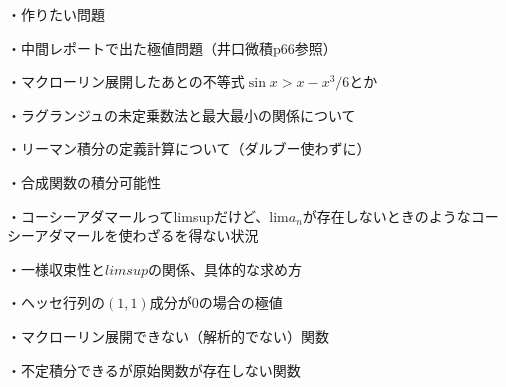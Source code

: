 \documentclass[dvipdfmx]{jsarticle}
\begin{document}
・作りたい問題

・中間レポートで出た極値問題（井口微積p66参照）

・マクローリン展開したあとの不等式$\sin x > x-x^3/6$とか

・ラグランジュの未定乗数法と最大最小の関係について

・リーマン積分の定義計算について（ダルブー使わずに）

・合成関数の積分可能性

・コーシーアダマールってlimsupだけど、lim$a_n$が存在しないときのようなコーシーアダマールを使わざるを得ない状況

・一様収束性と$limsup$の関係、具体的な求め方

・ヘッセ行列の$(1,1)$成分が$0$の場合の極値

・マクローリン展開できない（解析的でない）関数

・不定積分できるが原始関数が存在しない関数
\end{document}
